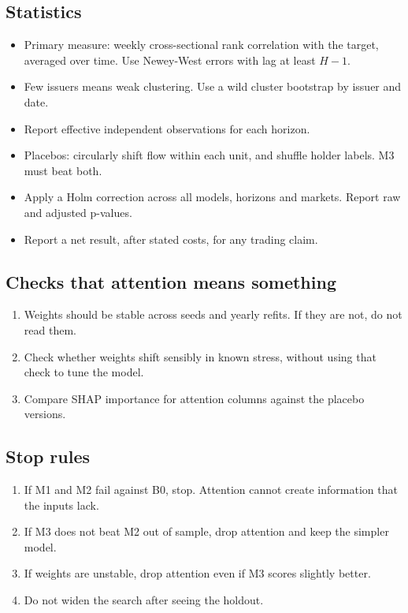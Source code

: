 \documentclass[11pt]{article}
\begin{document}
\subsection{Statistics}
\begin{itemize}
\item Primary measure: weekly cross-sectional rank correlation with the target, averaged over time. Use Newey-West errors with lag at least $H-1$.
\item Few issuers means weak clustering. Use a wild cluster bootstrap by issuer and date.
\item Report effective independent observations for each horizon.
\item Placebos: circularly shift flow within each unit, and shuffle holder labels. M3 must beat both.
\item Apply a Holm correction across all models, horizons and markets. Report raw and adjusted p-values.
\item Report a net result, after stated costs, for any trading claim.
\end{itemize}

\subsection{Checks that attention means something}
\begin{enumerate}
\item Weights should be stable across seeds and yearly refits. If they are not, do not read them.
\item Check whether weights shift sensibly in known stress, without using that check to tune the model.
\item Compare SHAP importance for attention columns against the placebo versions.
\end{enumerate}

\subsection{Stop rules}
\begin{enumerate}
\item If M1 and M2 fail against B0, stop. Attention cannot create information that the inputs lack.
\item If M3 does not beat M2 out of sample, drop attention and keep the simpler model.
\item If weights are unstable, drop attention even if M3 scores slightly better.
\item Do not widen the search after seeing the holdout.
\end{enumerate}
\end{document}
